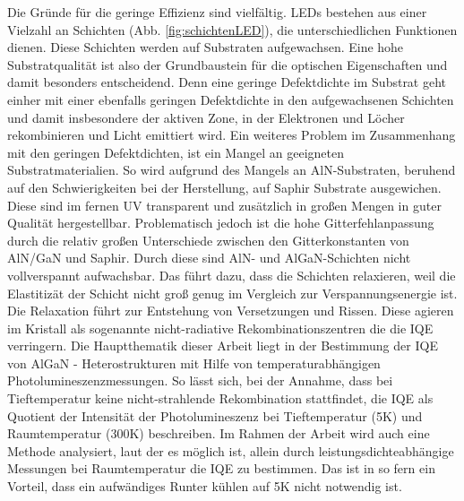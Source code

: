 Die Gründe für die geringe Effizienz sind vielfältig. LEDs bestehen aus einer Vielzahl an Schichten (Abb. \ref{fig:schichtenLED}), die unterschiedlichen Funktionen dienen. Diese Schichten werden auf Substraten aufgewachsen. Eine hohe Substratqualität ist also der Grundbaustein für die optischen Eigenschaften und damit besonders entscheidend. Denn eine geringe Defektdichte im Substrat geht einher mit einer ebenfalls geringen Defektdichte in den aufgewachsenen Schichten und damit insbesondere der aktiven Zone, in der Elektronen und Löcher rekombinieren und Licht emittiert wird. Ein weiteres Problem im Zusammenhang mit den geringen Defektdichten, ist ein Mangel an geeigneten Substratmaterialien. So wird aufgrund des Mangels an AlN-Substraten, beruhend auf den Schwierigkeiten bei der Herstellung, auf Saphir Substrate ausgewichen. Diese sind im fernen UV transparent und zusätzlich in großen Mengen in guter Qualität hergestellbar. Problematisch jedoch ist die hohe Gitterfehlanpassung durch die relativ großen Unterschiede zwischen den Gitterkonstanten von AlN/GaN und Saphir. Durch diese sind AlN- und AlGaN-Schichten nicht vollverspannt aufwachsbar. Das führt dazu, dass die Schichten relaxieren, weil die Elastitizät der Schicht nicht groß genug im Vergleich zur Verspannungsenergie ist. Die Relaxation führt zur Entstehung von Versetzungen und Rissen. Diese agieren im Kristall als sogenannte nicht-radiative Rekombinationszentren die die IQE verringern. Die Hauptthematik dieser Arbeit liegt in der  Bestimmung der IQE von AlGaN - Heterostrukturen mit Hilfe von temperaturabhängigen Photolumineszenzmessungen. So lässt sich, bei der Annahme, dass bei Tieftemperatur keine nicht-strahlende Rekombination stattfindet, die IQE als Quotient der Intensität der Photolumineszenz bei Tieftemperatur (5K) und Raumtemperatur (300K) beschreiben. Im Rahmen der Arbeit wird auch eine Methode analysiert, laut der es möglich ist, allein durch leistungsdichteabhängige Messungen bei Raumtemperatur die IQE zu bestimmen. Das ist in so fern ein Vorteil, dass ein aufwändiges Runter kühlen auf 5K nicht notwendig ist. 














